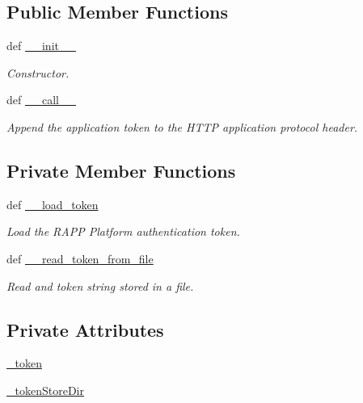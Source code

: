 \subsection*{Public Member Functions}
\begin{DoxyCompactItemize}
\item 
def \hyperlink{classRappCloud_1_1ServiceController_1_1RAPPAuth_1_1RAPPAuth_ab17204a0a45a2b49a59c43bf59ac7a93}{\-\_\-\-\_\-init\-\_\-\-\_\-}
\begin{DoxyCompactList}\small\item\em Constructor. \end{DoxyCompactList}\item 
def \hyperlink{classRappCloud_1_1ServiceController_1_1RAPPAuth_1_1RAPPAuth_a2ee81e35f8e8b617fc3177a8fdf2be07}{\-\_\-\-\_\-call\-\_\-\-\_\-}
\begin{DoxyCompactList}\small\item\em Append the application token to the H\-T\-T\-P application protocol header. \end{DoxyCompactList}\end{DoxyCompactItemize}
\subsection*{Private Member Functions}
\begin{DoxyCompactItemize}
\item 
def \hyperlink{classRappCloud_1_1ServiceController_1_1RAPPAuth_1_1RAPPAuth_a149651cee9690b01ce29553cde57671a}{\-\_\-\-\_\-load\-\_\-token}
\begin{DoxyCompactList}\small\item\em Load the R\-A\-P\-P Platform authentication token. \end{DoxyCompactList}\item 
def \hyperlink{classRappCloud_1_1ServiceController_1_1RAPPAuth_1_1RAPPAuth_ad3922bc7e2d1e39ab360ce70e7a3f9b8}{\-\_\-\-\_\-read\-\_\-token\-\_\-from\-\_\-file}
\begin{DoxyCompactList}\small\item\em Read and token string stored in a file. \end{DoxyCompactList}\end{DoxyCompactItemize}
\subsection*{Private Attributes}
\begin{DoxyCompactItemize}
\item 
\hyperlink{classRappCloud_1_1ServiceController_1_1RAPPAuth_1_1RAPPAuth_a1e729169998595ec592b3d742584d3b4}{\-\_\-token}
\item 
\hyperlink{classRappCloud_1_1ServiceController_1_1RAPPAuth_1_1RAPPAuth_a4566caf8f02272e821a871776e0f1b8d}{\-\_\-token\-Store\-Dir}
\end{DoxyCompactItemize}


